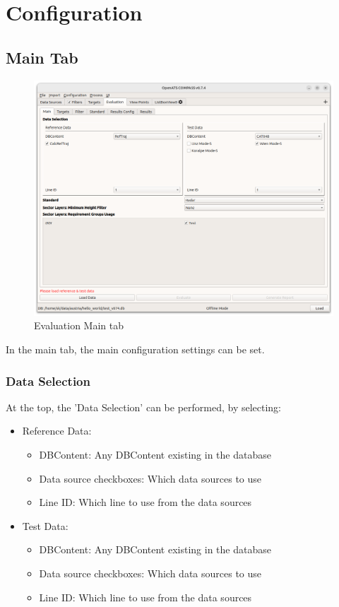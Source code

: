 \section{Configuration}
\label{sec:eval_config} 

\subsection{Main Tab}

\begin{figure}[H]
  \hspace*{-2cm}
    \includegraphics[width=18cm]{figures/eval.png}
  \caption{Evaluation Main tab}
\end{figure}

In the main tab, the main configuration settings can be set. \\

\subsubsection{Data Selection}

At the top, the 'Data Selection' can be performed, by selecting:
\begin{itemize}  
\item Reference Data:
\begin{itemize}  
\item DBContent: Any DBContent existing in the database
\item Data source checkboxes: Which data sources to use
\item Line ID: Which line to use from the data sources
\end{itemize}
\item Test Data:
\begin{itemize}  
\item DBContent: Any DBContent existing in the database
\item Data source checkboxes: Which data sources to use
\item Line ID: Which line to use from the data sources
\end{itemize}
\end{itemize}
\ \\

